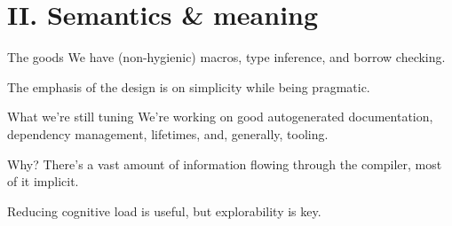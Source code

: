 \documentclass[aspectratio=169]{beamer}
\begin{document}
  \section{II. Semantics \& meaning}
  \begin{frame}{The goods}
    We have (non-hygienic) macros, type inference, and borrow checking.
    \linebreak

    The emphasis of the design is on simplicity while being pragmatic.
  \end{frame}
  \begin{frame}{What we’re still tuning}
    We’re working on good autogenerated documentation, dependency management,
    lifetimes, and, generally, tooling.
  \end{frame}
  \begin{frame}{Why?}
    There’s a vast amount of information flowing through the compiler, most
    of it implicit. \linebreak

    Reducing cognitive load is useful, but explorability is key.
  \end{frame}
\end{document}
